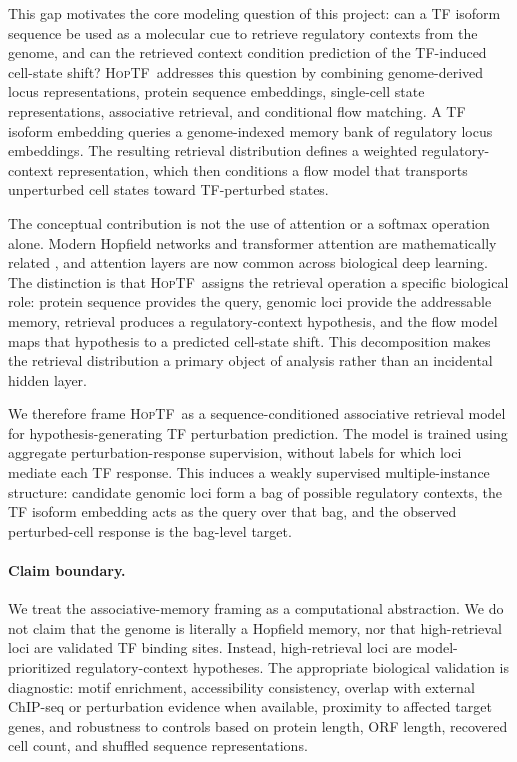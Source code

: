 \documentclass[11pt]{article}
\newcommand{\hoptf}{\textsc{HopTF}}
\begin{document}
This gap motivates the core modeling question of this project: can a TF isoform sequence be used as a molecular cue to retrieve regulatory contexts from the genome, and can the retrieved context condition prediction of the TF-induced cell-state shift? \hoptf\ addresses this question by combining genome-derived locus representations, protein sequence embeddings, single-cell state representations, associative retrieval, and conditional flow matching. A TF isoform embedding queries a genome-indexed memory bank of regulatory locus embeddings. The resulting retrieval distribution defines a weighted regulatory-context representation, which then conditions a flow model that transports unperturbed cell states toward TF-perturbed states.

The conceptual contribution is not the use of attention or a softmax operation alone. Modern Hopfield networks and transformer attention are mathematically related \citep{ramsauer2021,vaswani2017}, and attention layers are now common across biological deep learning. The distinction is that \hoptf\ assigns the retrieval operation a specific biological role: protein sequence provides the query, genomic loci provide the addressable memory, retrieval produces a regulatory-context hypothesis, and the flow model maps that hypothesis to a predicted cell-state shift. This decomposition makes the retrieval distribution a primary object of analysis rather than an incidental hidden layer.

We therefore frame \hoptf\ as a sequence-conditioned associative retrieval model for hypothesis-generating TF perturbation prediction. The model is trained using aggregate perturbation-response supervision, without labels for which loci mediate each TF response. This induces a weakly supervised multiple-instance structure: candidate genomic loci form a bag of possible regulatory contexts, the TF isoform embedding acts as the query over that bag, and the observed perturbed-cell response is the bag-level target.

\paragraph{Claim boundary.}
We treat the associative-memory framing as a computational abstraction. We do not claim that the genome is literally a Hopfield memory, nor that high-retrieval loci are validated TF binding sites. Instead, high-retrieval loci are model-prioritized regulatory-context hypotheses. The appropriate biological validation is diagnostic: motif enrichment, accessibility consistency, overlap with external ChIP-seq or perturbation evidence when available, proximity to affected target genes, and robustness to controls based on protein length, ORF length, recovered cell count, and shuffled sequence representations.
\end{document}
